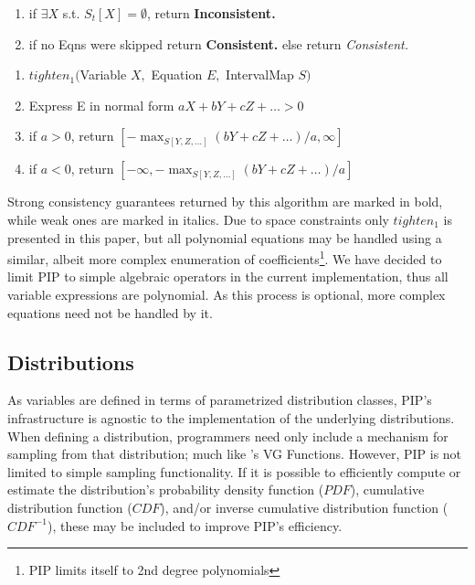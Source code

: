 \begin{algorithm}
\begin{enumerate}
\item \hspace*{0.3in} if $\exists X$ s.t. $S_{t}[X] = \emptyset$, return \textbf{Inconsistent.}
\item \hspace*{0.1in} if no Eqns were skipped return \textbf{Consistent.} else return \textit{Consistent.}
\end{enumerate}
\begin{enumerate}
\item $tighten_1($Variable $X,$ Equation $E,$ IntervalMap $S)$
\item \hspace*{0.1in} Express E in normal form $aX + bY + cZ + \ldots > 0$
\item \hspace*{0.2in} if $a > 0$, return $[-\max_{S[Y,Z,\ldots]}(bY+cZ+\ldots)/a, \infty]$
\item \hspace*{0.2in} if $a < 0$, return $[-\infty, -\max_{S[Y,Z,\ldots]}(bY+cZ+\ldots)/a]$
\end{enumerate}
\end{algorithm}%

Strong consistency guarantees returned by this algorithm are marked in bold, while weak ones are marked in italics.  Due to space constraints only $tighten_1$ is presented in this paper, but all polynomial equations may be handled using a similar, albeit more complex enumeration of coefficients\footnote{PIP limits itself to 2nd degree polynomials}.  We have decided to limit PIP to simple algebraic operators in the current implementation, thus all variable expressions are polynomial.  As this process is optional, more complex equations need not be handled by it.

\subsection{Distributions}
As variables are defined in terms of parametrized distribution classes, PIP's infrastructure is agnostic to the implementation of the underlying distributions.  When defining a distribution, programmers need only include a mechanism for sampling from that distribution; much like \cite{MCDB}'s VG Functions.  However, PIP is not limited to simple sampling functionality.  If it is possible to efficiently compute or estimate the distribution's probability density function ($PDF$), cumulative distribution function ($CDF$), and/or inverse cumulative distribution function ($CDF^{-1}$), these may be included to improve PIP's efficiency.  

